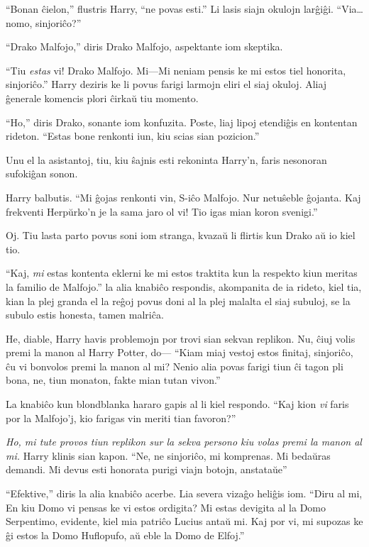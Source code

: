 ``Bonan ĉielon,'' flustris Harry, ``ne povas esti.'' Li lasis siajn
okulojn larĝiĝi. ``Via\ldots nomo, sinjoriĉo?''

``Drako Malfojo,'' diris Drako Malfojo, aspektante iom skeptika.

``Tiu \emph{estas} vi! Drako Malfojo. Mi—Mi neniam pensis ke mi estos
tiel honorita, sinjoriĉo.'' Harry deziris ke li povus farigi larmojn
eliri el siaj okuloj. Aliaj ĝenerale komencis plori ĉirkaŭ tiu momento.

``Ho,'' diris Drako, sonante iom konfuzita. Poste, liaj lipoj etendiĝis en
kontentan rideton. ``Estas bone renkonti iun, kiu scias sian pozicion.''

Unu el la asistantoj, tiu, kiu ŝajnis esti rekoninta Harry'n, faris
nesonoran sufokiĝan sonon.

Harry balbutis. ``Mi ĝojas renkonti vin, S-iĉo Malfojo. Nur netuŝeble
ĝojanta. Kaj frekventi Herpŭrko'n je la sama jaro ol vi! Tio igas mian
koron svenigi.''

Oj. Tiu lasta parto povus soni iom stranga, kvazaŭ li flirtis kun
Drako aŭ io kiel tio.

``Kaj, \emph{mi} estas kontenta eklerni ke mi estos traktita kun la
respekto kiun meritas la familio de Malfojo.'' la alia knabiĉo
respondis, akompanita de ia rideto, kiel tia, kian la plej granda el
la reĝoj povus doni al la plej malalta el siaj subuloj, se la subulo
estis honesta, tamen malriĉa.

He, diable, Harry havis problemojn por trovi sian sekvan replikon. Nu,
ĉiuj volis premi la manon al Harry Potter, do— ``Kiam miaj vestoj
estos finitaj, sinjoriĉo, ĉu vi bonvolos premi la manon al mi? Nenio
alia povas farigi tiun ĉi tagon pli bona, ne, tiun monaton, fakte mian
tutan vivon.''

La knabiĉo kun blondblanka hararo gapis al li kiel respondo. ``Kaj kion
\emph{vi} faris por la Malfojo'j, kio farigas vin meriti tian favoron?''

\emph{Ho, mi tute provos tiun replikon sur la sekva persono kiu volas
premi la manon al mi.} Harry klinis sian kapon. ``Ne, ne sinjoriĉo, mi
komprenas. Mi bedaŭras demandi. Mi devus esti honorata purigi
viajn botojn, anstataŭe''

``Efektive,'' diris la alia knabiĉo acerbe. Lia severa vizaĝo heliĝis
iom. ``Diru al mi, En kiu Domo vi pensas ke vi estos ordigita? Mi
estas devigita al la Domo Serpentimo, evidente, kiel mia patriĉo Lucius
antaŭ mi. Kaj por vi, mi supozas ke ĝi estos la Domo Huflopufo, aŭ eble
la Domo de Elfoj.''

